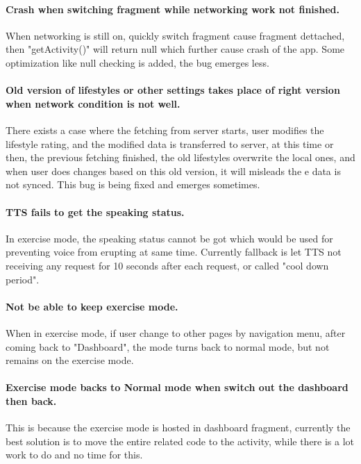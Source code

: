 \paragraph{Crash when switching fragment while networking work not finished.} 
When networking is still on, quickly switch fragment cause fragment dettached, then "getActivity()" will return null which further cause crash of the app. Some optimization like null checking is added, the bug emerges less. 
\paragraph{Old version of lifestyles or other settings takes place of right version when network condition is not well.}
There exists a case where the fetching from server starts, user modifies the lifestyle rating, and the modified data is transferred to server, at this time or then, the previous fetching finished, the old lifestyles overwrite the local ones, and when user does changes based on this old version, it will misleads the e data is not synced. This bug is being fixed and emerges sometimes. 
\paragraph{TTS fails to get the speaking status.}
In exercise mode, the speaking status cannot be got which would be used for preventing voice from erupting at same time. Currently fallback is let TTS not receiving any request for 10 seconds after each request, or called "cool down period". 
\paragraph{Not be able to keep exercise mode.}
When in exercise mode, if user change to other pages by navigation menu, after coming back to "Dashboard", the mode turns back to normal mode, but not remains on the exercise mode. 
\paragraph{Exercise mode backs to Normal mode when switch out the dashboard then back.} This is because the exercise mode is hosted in dashboard fragment, currently the best solution is to move the entire related code to the activity, while there is a lot work to do and no time for this.